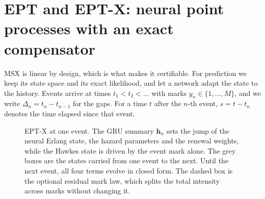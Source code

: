 \section{EPT and EPT-X: neural point processes with an exact compensator}\label{sec:ept}

MSX is linear by design, which is what makes it certifiable. For prediction we keep its state space
and its exact likelihood, and let a network adapt the state to the history. Events arrive at times $t_1<t_2<\dots$ with marks
$y_n\in\{1,\dots,M\}$, and we write $\Delta_n=t_n-t_{n-1}$ for the gaps. For a time $t$ after the
$n$-th event, $s=t-t_n$ denotes the time elapsed since that event.

\begin{figure}[t]\centering

\caption{EPT-X at one event. The GRU summary $\bm h_n$ sets the jump of the neural Erlang state,
the hazard parameters and the renewal weights, while the Hawkes state is driven by the event mark
alone. The grey boxes are the states carried from one event to the next. Until the next event,
all four terms evolve in closed form. The dashed box is the optional residual mark law, which
splits the total intensity across marks without changing it.}\label{fig:eptx}
\end{figure}

